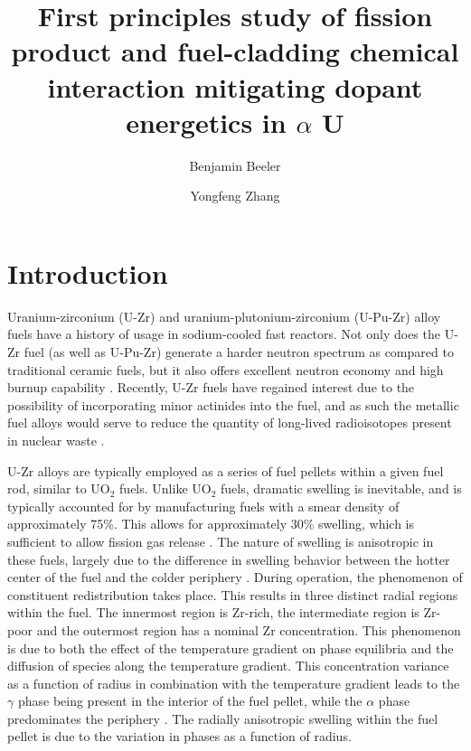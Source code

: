 \documentclass[review]{elsarticle}
\begin{document}
\begin{frontmatter}
\title{First principles study of fission product and fuel-cladding chemical interaction mitigating dopant energetics in $\alpha$ U}

\author[inl]{Benjamin Beeler}
\author[inl]{Yongfeng Zhang}
\address[inl]{Idaho National Laboratory, Idaho Falls, ID 83415}

\begin{abstract}

\end{abstract}
\end{frontmatter}

\linenumbers

\section{Introduction}
Uranium-zirconium (U-Zr) and uranium-plutonium-zirconium (U-Pu-Zr) alloy fuels have a history of usage in sodium-cooled fast reactors. Not only does the U-Zr fuel (as well as U-Pu-Zr) generate a harder neutron spectrum as compared to traditional ceramic fuels, but it also offers excellent neutron economy and high burnup capability \cite{hofman1997}. Recently, U-Zr fuels have regained interest due to the possibility of incorporating minor actinides into the fuel, and as such the metallic fuel alloys would serve to reduce the quantity of long-lived radioisotopes present in nuclear waste \cite{capriotti2017}. 

U-Zr alloys are typically employed as a series of fuel pellets within a given fuel rod, similar to UO$_{2}$ fuels. Unlike UO$_{2}$ fuels, dramatic swelling is inevitable, and is typically accounted for by manufacturing fuels with a smear density of approximately 75{\%}. This allows for approximately 30\% swelling, which is sufficient to allow fission gas release \cite{beck1968}. The nature of swelling is anisotropic in these fuels, largely due to the difference in swelling behavior between the hotter center of the fuel and the colder periphery \cite{hofman1990}. During operation, the phenomenon of constituent redistribution takes place. This results in three distinct radial regions within the fuel. The innermost region is Zr-rich, the intermediate region is Zr-poor and the outermost region has a nominal Zr concentration. This phenomenon is due to both the effect of the temperature gradient on phase equilibria and the diffusion of species along the temperature gradient. This concentration variance as a function of radius in combination with the temperature gradient leads to the $\gamma$ phase being present in the interior of the fuel pellet, while the $\alpha$ phase predominates the periphery \cite{kobayashi1990, kim2004}. The radially anisotropic swelling within the fuel pellet is due to the variation in phases as a function of radius.
\end{document}
